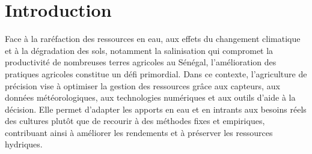 \section{Introduction}
Face à la raréfaction des ressources en eau, aux effets du changement climatique et à la dégradation des sols, notamment la salinisation
qui compromet la productivité de nombreuses terres agricoles au Sénégal, l’amélioration des pratiques agricoles constitue un défi primordial.
Dans ce contexte, l’agriculture de précision vise à optimiser la gestion des ressources grâce aux capteurs, aux données météorologiques, aux 
technologies numériques et aux outils d’aide à la décision. Elle permet d’adapter les apports en eau et en intrants aux besoins réels des cultures
plutôt que de recourir à des méthodes fixes et empiriques, contribuant ainsi à améliorer les rendements et à préserver les ressources hydriques.